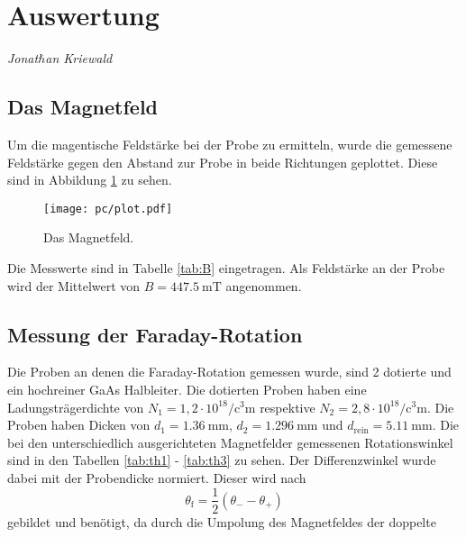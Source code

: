 \section{Auswertung}
\label{sec:Auswertung}
{\footnotesize \textit{Jonat$\hbar$an Kriewald}}

\subsection{Das Magnetfeld}
Um die magentische Feldstärke bei der Probe zu ermitteln, wurde die gemessene Feldstärke gegen den Abstand zur Probe in beide Richtungen geplottet.
Diese sind in Abbildung \ref{fig:plot} zu sehen.
\begin{figure}
  \centering
  \texttt{[image: pc/plot.pdf]}
  \caption{Das Magnetfeld.}
  \label{fig:plot}
\end{figure}
Die Messwerte sind in Tabelle \ref{tab:B} eingetragen.
Als Feldstärke an der Probe wird der Mittelwert von $B = \SI{447.5}{\milli\tesla}$ angenommen.

\subsection{Messung der Faraday-Rotation}
Die Proben an denen die Faraday-Rotation gemessen wurde, sind 2 dotierte und ein hochreiner GaAs Halbleiter.
Die dotierten Proben haben eine Ladungsträgerdichte von $N_1 =  1{,}2 \cdot 10^{18} \si{\per\cubic\centi\meter}$ respektive $N_2 = 2{,}8 \cdot 10^{18} \si{\per\cubic\centi\meter}$.
Die Proben haben Dicken von $d_1 = \SI{1.36}{\milli\meter}$, $d_2 = \SI{1.296}{\milli\meter}$ und $d_\text{rein} = \SI{5.11}{\milli\meter}$.
Die bei den unterschiedlich ausgerichteten Magnetfelder gemessenen Rotationswinkel sind in den Tabellen \ref{tab:th1} - \ref{tab:th3} zu sehen.
Der Differenzwinkel wurde dabei mit der Probendicke normiert.
Dieser wird nach 
\begin{equation}
	\theta_\text{f} = \frac{1}{2}(\theta_- -\theta_+)
\end{equation}
gebildet und benötigt, da durch die Umpolung des Magnetfeldes der doppelte 




